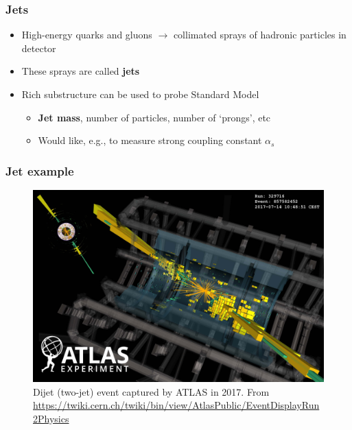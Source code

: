\documentclass{beamer}
\begin{document}
\begin{frame}
\begin{columns}
\begin{figure}
		\end{figure}
		\end{columns}
	\end{frame}

	\begin{frame}
		\frametitle{Jets}

		\begin{itemize}
			\item High-energy quarks and gluons $\to$ collimated sprays of hadronic particles in detector

			\item These sprays are called \textbf{jets}

			\item Rich substructure can be used to probe Standard Model
			\begin{itemize}
				\item \textbf{Jet mass}, number of particles, number of `prongs', etc

				\item Would like, e.g., to measure strong coupling constant $\alpha_s$
			\end{itemize}
		\end{itemize}
	\end{frame}

	\begin{frame}
		\frametitle{Jet example}
		\begin{figure}
			\includegraphics[width=0.8\columnwidth]{figures/DijetHighMass9.3TeV-VP1-nocone_small.jpg}

			\caption{Dijet (two-jet) event captured by ATLAS in 2017. From \url{https://twiki.cern.ch/twiki/bin/view/AtlasPublic/EventDisplayRun2Physics}}
		\end{figure}
	\end{frame}
\end{document}
